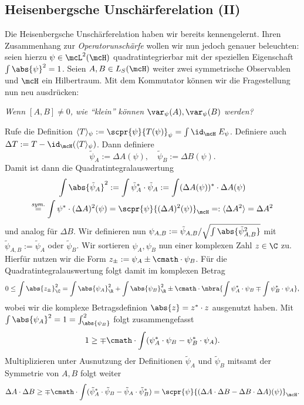 \documentclass{subfiles}
\begin{document}
    \subsection{Heisenbergsche Unschärferelation (II)}
        Die Heisenbergsche Unschärferelation haben wir bereits kennengelernt. Ihren Zusammenhang zur \emph{Operatorunschärfe} wollen wir nun jedoch genauer beleuchten: seien hierzu $\psi\in\mcL^2(\mcH)$ quadratintegrierbar mit der speziellen Eigenschaft $\int\abs{\psi}^2 = 1$. Seien $A,B\in L_S(\mcH)$ weiter zwei symmetrische Observablen und $\mcH$ ein Hilbertraum. Mit dem Kommutator können wir die Fragestellung nun neu ausdrücken:
        \begin{center}
            \textit{Wenn $[A,B]\neq 0$, wie \enquote{klein} können $\var_\psi(A),\var_\psi(B)$ werden?}
        \end{center}
        Rufe die Definition $\langle T\rangle_\psi := \scpr{\psi}{T(\psi)}_\psi = \int\id_\mcH\;E_\psi$. Definiere auch $\Delta T:= T-\id_{\mcH}(\langle T\rangle_\psi)$. Dann definiere 
        \[\tilde\psi_A:=\Delta A(\psi),\quad \tilde\psi_B:=\Delta B(\psi).\]
        Damit ist dann die Quadratintegralauswertung
        \begin{multline*}
            \int\abs{\tilde\psi_A}^2 := \int\tilde\psi_A^*\cdot\tilde\psi_A := \int (\Delta A(\psi))^*\cdot \Delta A(\psi) \\
            \stackrel{\textit{sym.}}{=} \int \psi^*\cdot (\Delta A)^2(\psi) = \scpr{\psi}{(\Delta A)^2(\psi)}_\mcH =: \langle\Delta A^2\rangle = \Delta A^2
        \end{multline*}
        und analog für $\Delta B$. Wir definieren nun $\psi_{A,B}:=\tilde\psi_{A,B}/\sqrt{\int\abs{\tilde\psi_{A,B}^2}}$ mit $\tilde\psi_{A,B}:= \tilde\psi_A$ oder $\tilde\psi_B$. Wir sortieren $\psi_A,\psi_B$ nun einer komplexen Zahl $z\in\C$ zu. Hierfür nutzen wir die Form $z_\pm:=\psi_A\pm\cmath\cdot\psi_B$. Für die Quadratintegralauswertung folgt damit im komplexen Betrag
        \[0\leq\int\abs{z_\pm}_\C^2 = \int\abs{\psi_A}_\R^2+\int\abs{\psi_B}_\R^2\pm\cmath\cdot\nbra{\int\psi_A^*\cdot\psi_B\mp\int\psi_B^*\cdot\psi_A},\]
        wobei wir die komplexe Betragsdefinion $\abs{z} = z^*\cdot z$ ausgenutzt haben. Mit $\int\abs{\psi_A}^2 = 1 = \int_\abs{\psi_B}^2$ folgt zusammengefasst
        \[1\geq \mp\cmath\cdot\int (\psi_A^*\cdot\psi_B - \psi_B^*\cdot\psi_A).\]
        Multiplizieren unter Ausnutzung der Definitionen $\tilde\psi_A$ und $\tilde\psi_B$ mitsamt der Symmetrie von $A,B$ folgt weiter
        \[\Delta A\cdot\Delta B\geq\mp\cmath\cdot\int(\tilde\psi_A^*\cdot\tilde\psi_B-\tilde\psi_A\cdot\tilde\psi_B^*) = \scpr{\psi}{(\Delta A\cdot\Delta B-\Delta B\cdot\Delta A)(\psi)}_\mcH.\]
\end{document}
